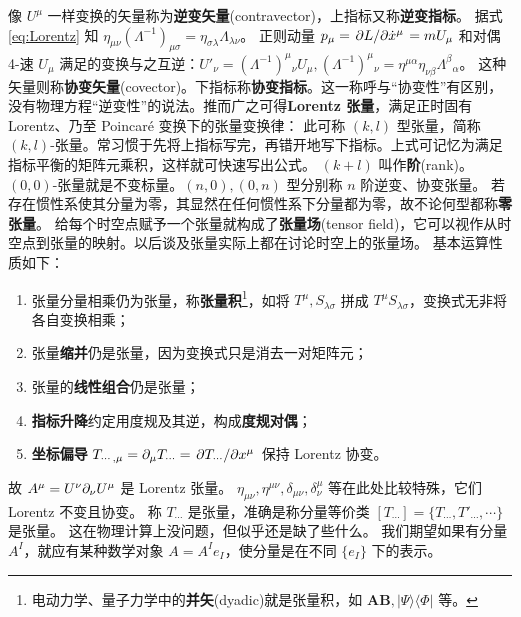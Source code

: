 像 $U^\mu$ 一样变换的矢量称为\textbf{逆变矢量}(contravector)，上指标又称\textbf{逆变指标}。
据式 \eqref{eq:Lorentz} 知 $\eta_{\mu\nu}(\Lambda^{-1})_{\mu\sigma}=\eta_{\sigma\lambda}\Lambda_{\lambda\nu}$。
正则动量 $p_\mu=\pdv*{L}{\dot x^\mu}=mU_\mu$ 和对偶 4-速 $U_\mu$ 满足的变换与之互逆：$U'_\nu=(\Lambda^{-1})^{\mu}{}_{\nu} U_\mu, (\Lambda^{-1})^{\mu}{}_{\nu}=\eta^{\mu\alpha}\eta_{\nu\beta}\Lambda^{\beta}{}_{\alpha}$。
这种矢量则称\textbf{协变矢量}(covector)。下指标称\textbf{协变指标}。这一称呼与“协变性”有区别，没有物理方程“逆变性”的说法。推而广之可得\textbf{Lorentz 张量}，满足正时固有 Lorentz、乃至 Poincaré 变换下的张量变换律：
此可称 $(k,l)$ 型张量，简称 $(k,l)$-张量。常习惯于先将上指标写完，再错开地写下指标。上式可记忆为满足指标平衡的矩阵元乘积，这样就可快速写出公式。
$(k+l)$ 叫作\textbf{阶}(rank)。$(0,0)$-张量就是不变标量。$(n,0),(0,n)$ 型分别称 $n$ 阶逆变、协变张量。
若存在惯性系使其分量为零，其显然在任何惯性系下分量都为零，故不论何型都称\textbf{零张量}。
给每个时空点赋予一个张量就构成了\textbf{张量场}(tensor field)，它可以视作从时空点到张量的映射。以后谈及张量实际上都在讨论时空上的张量场。
基本运算性质如下：
\begin{enumerate}
    \item 张量分量相乘仍为张量，称\textbf{张量积}\footnote{电动力学、量子力学中的\textbf{并矢}(dyadic)就是张量积，如 $\bm A\bm B,|\Psi\rangle\langle\Phi|$ 等。}，如将 $T^\mu,S_{\lambda\sigma}$ 拼成 $T^\mu S_{\lambda\sigma}$，变换式无非将各自变换相乘；
    \item 张量\textbf{缩并}仍是张量，因为变换式只是消去一对矩阵元；
    \item 张量的\textbf{线性组合}仍是张量；
    \item \textbf{指标升降}约定用度规及其逆，构成\textbf{度规对偶}；
    \item \textbf{坐标偏导} $T_{\cdots,\mu}=\partial_\mu T_{\cdots}=\pdv*{T_{\cdots}}{x^\mu}$ 保持 Lorentz 协变。
\end{enumerate}
故 $A^\mu=U^\nu\partial_\nu U^\mu$ 是 Lorentz 张量。
$\eta_{\mu\nu},\eta^{\mu\nu},\delta_{\mu\nu},\delta^\mu_\nu$ 等在此处比较特殊，它们 Lorentz 不变且协变。
称 $T_{\cdots}$ 是张量，准确是称分量等价类 $[T_{\cdots}]=\{T_{\cdots},T'_{\cdots},\cdots\}$ 是张量。
这在物理计算上没问题，但似乎还是缺了些什么。
我们期望如果有分量 $A^I$，就应有某种数学对象 $A=A^I e_I$，使分量是在不同 $\{e_I\}$ 下的表示。
